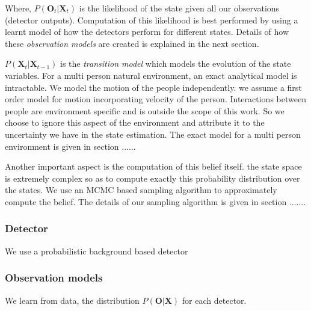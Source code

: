 Where, $P(\textbf{O}_{t} | \textbf{X}_{t})$ is the likelihood of the state given all our observations (detector outputs). Computation of this likelihood is best performed by using a learnt model of how the detectors perform for different states. Details of how these \textit{observation models} are created is explained in the next section.

$P(\textbf{X}_{t}|\textbf{X}_{t-1})$ is the \textit{transition model} which models the evolution of the state variables. For a multi person natural environment, an exact analytical model is intractable. We model the motion of the people independently. we assume a first order model for motion incorporating velocity of the person. Interactions between people are environment specific and is outside the scope of this work. So we choose to ignore this aspect of the environment and attribute it to the uncertainty we have in the state estimation. The exact model for a multi person environment is given in section ......

Another important aspect is the computation of this belief itself. the state space is extremely complex so as to compute exactly this probability 
distribution over the states. We use an MCMC based sampling algorithm to approximately compute the belief. The details of our sampling algorithm is given in section .......


\subsubsection{Detector}
We use a probabilistic background based detector
\subsubsection{Observation models}
We learn from data, the distribution $P(\textbf{O}|\textbf{X})$ for each detector.








